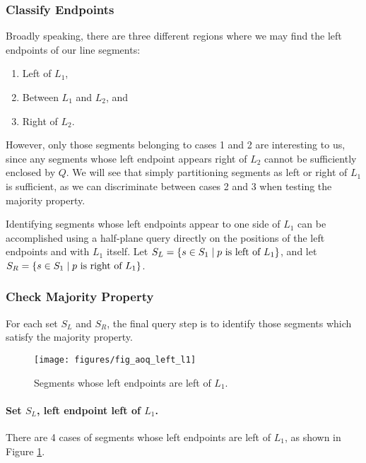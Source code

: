 \subsubsection{Classify Endpoints}
\label{:slabs:one:details:classify}

Broadly speaking, there are three different regions where we may find the left endpoints of our line segments:
\begin{enumerate}
 \item Left of $L_1$,
 \item Between $L_1$ and $L_2$, and
 \item Right of $L_2$.
\end{enumerate}

However, only those segments belonging to cases 1 and 2 are interesting to us, since any segments whose left endpoint appears right of $L_2$ cannot be sufficiently enclosed by $Q$. We will see that simply partitioning segments as left or right of $L_1$ is sufficient, as we can discriminate between cases 2 and 3 when testing the majority property.

Identifying segments whose left endpoints appear to one side of $L_1$ can be accomplished using a half-plane query directly on the positions of the left endpoints and with $L_1$ itself.  Let $S_L = \{ s \in S_1 \;|\; p \text{ is left of } L_1 \}$, and let $S_R = \{ s \in S_1 \;|\; p \text{ is right of } L_1 \}$.


\subsubsection{Check Majority Property}
\label{:slabs:one:details:majority}

For each set $S_L$ and $S_R$, the final query step is to identify those segments which satisfy the majority property.

\begin{figure}[t]
\begin{center}
  \texttt{[image: figures/fig\_aoq\_left\_l1]}
  \caption{Segments whose left endpoints are left of $L_1$.}
  \label{fig:slabs:one:aoq_left_l1}
\end{center}
\end{figure}

\paragraph{Set $S_L$, left endpoint left of $L_1$.} There are 4 cases of segments whose left endpoints are left of $L_1$, as shown in Figure \ref{fig:slabs:one:aoq_left_l1}.

